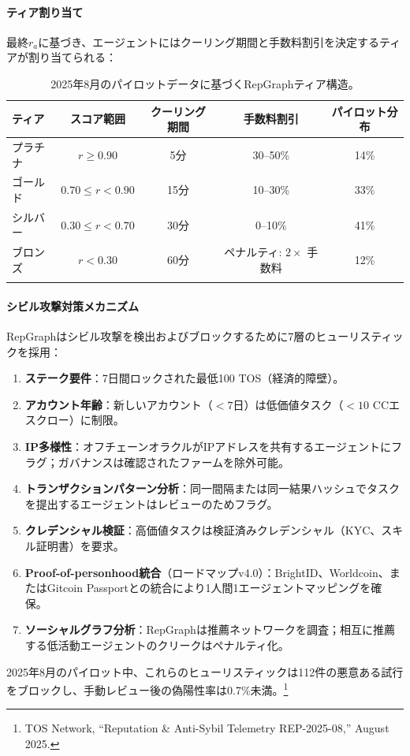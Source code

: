 \documentclass[11pt]{article}
\begin{document}
\paragraph{ティア割り当て} 最終$r_a$に基づき、エージェントにはクーリング期間と手数料割引を決定するティアが割り当てられる：
\begin{longtable}{@{}lcccc@{}}
\toprule
\textbf{ティア} & \textbf{スコア範囲} & \textbf{クーリング期間} & \textbf{手数料割引} & \textbf{パイロット分布} \\\midrule
プラチナ & $r \geq 0.90$ & 5分 & 30--50\% & 14\% \\
ゴールド & $0.70 \leq r < 0.90$ & 15分 & 10--30\% & 33\% \\
シルバー & $0.30 \leq r < 0.70$ & 30分 & 0--10\% & 41\% \\
ブロンズ & $r < 0.30$ & 60分 & ペナルティ: $2 \times$ 手数料 & 12\% \\\bottomrule
\caption{2025年8月のパイロットデータに基づくRepGraphティア構造。}
\label{tab:reputation-tiers}
\end{longtable}

\paragraph{シビル攻撃対策メカニズム} RepGraphはシビル攻撃を検出およびブロックするために7層のヒューリスティックを採用：
\begin{enumerate}[noitemsep]
  \item \textbf{ステーク要件}：7日間ロックされた最低100 TOS（経済的障壁）。
  \item \textbf{アカウント年齢}：新しいアカウント（$<7$日）は低価値タスク（$<10$ CCエスクロー）に制限。
  \item \textbf{IP多様性}：オフチェーンオラクルがIPアドレスを共有するエージェントにフラグ；ガバナンスは確認されたファームを除外可能。
  \item \textbf{トランザクションパターン分析}：同一間隔または同一結果ハッシュでタスクを提出するエージェントはレビューのためフラグ。
  \item \textbf{クレデンシャル検証}：高価値タスクは検証済みクレデンシャル（KYC、スキル証明書）を要求。
  \item \textbf{Proof-of-personhood統合}（ロードマップv4.0）：BrightID、Worldcoin、またはGitcoin Passportとの統合により1人間1エージェントマッピングを確保。
  \item \textbf{ソーシャルグラフ分析}：RepGraphは推薦ネットワークを調査；相互に推薦する低活動エージェントのクリークはペナルティ化。
\end{enumerate}
2025年8月のパイロット中、これらのヒューリスティックは112件の悪意ある試行をブロックし、手動レビュー後の偽陽性率は0.7\%未満。\footnote{TOS Network, ``Reputation \& Anti-Sybil Telemetry REP-2025-08,'' August 2025.}
\end{document}
